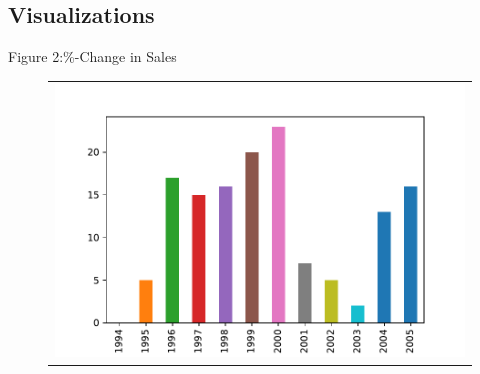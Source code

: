 \documentclass[a4paper, 11pt, margin=1in]{article}
\begin{document}


\subsection{Visualizations}

Figure 2:\%-Change in Sales\\

\begin{figure}[h]
   \centering
   \begin{tabular}{c}
       \includegraphics[page=1,width=.9\textwidth]{fig2.pdf} \\
   \end{tabular}
\end{figure}

%
%
\end{document}
